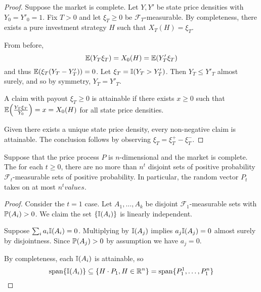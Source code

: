 \begin{proof}
  Suppose the market is complete.  Let $Y, Y'$ be state price
  densities with $Y_{0} = Y'_{0}  = 1$.  Fix $T > 0$ and let $\xi_{T}
  \geq 0$ be $\mathcal{F}_{T}$-measurable.  By completeness, there
  exists a pure investment strategy $H$ such that $X_{T}(H) =
  \xi_{T}$.

  From before,
  \begin{equation}
    \label{eq:25}
    \E{Y_{T} \xi_{T}} = X_{0}(H) = \E{Y'_{T} \xi_{T}}
  \end{equation} and thus $\E{\xi_{T}(Y_{T} - Y'_{T})} = 0$.  Let
  $\xi_{T} = \I{Y_{T} > Y'_{T}}$. Then $Y_{T} \leq Y'_{T}$ almost
  surely, and so by symmetry, $Y_{T} = Y'_{T}$.

  A claim with payout $\xi_{T} \geq 0$ is attainable if there exists
  $x \geq 0$ such that $\E{\frac{Y_{T} \xi_{T}}{Y_{0}}} = x =
  X_{0}(H)$ for all state price densities.

  Given there exists a unique state price density, every non-negative
  claim is attainable.  The conclusion follows by observing $\xi_{T} =
  \xi_{T}^{+} - \xi_{T}^{-}$.
\end{proof}

\begin{thm}
  \label{defn:discrete_time_models:28}
  Suppose that the price process $P$ is $n$-dimensional and the market
  is complete.  The for each $t \geq 0$, there are no more than
  $n^{t}$ disjoint sets of positive probability
  $\mathcal{F}_{t}$-measurable sets of positive probability.  In
  particular, the random vector $P_{t}$ takes on at most $n^{t} values$.
\end{thm}

\begin{proof}
  Consider the $t=1$ case.  Let $A_{1}, \dots, A_{k}$ be  disjoint
  $\mathcal{F}_{1}$-measurable sets with $\Prob{A_{i}} > 0$.  We claim
  the set $\{ \I{A_{i}} \}$ is linearly independent.

  Suppose $\sum_{i} a_{i} \I{A_{i}} = 0$.  Multiplying by $\I{A_{j}}$
  implies $a_{j} \I{A_{j}} = 0$ almost surely by disjointness.  Since
  $\Prob{A_{j}} > 0$ by assumption we have $a_{j} = 0$.

  By completeness, each $\I{A_{i}}$ is attainable, so
  \begin{equation}
    \label{eq:26}
    \vecspan \{ \I{A_{i}} \} \subseteq \{ H \cdot P_{1}, H \in \R^{n} \}
    =  \vecspan \{ P^{1}_{1}, \dots, P^{n}_{1} \}
  \end{equation} 
\end{proof}

